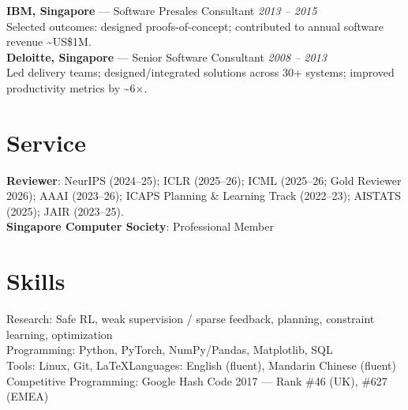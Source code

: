 \documentclass[10pt,a4paper]{article}
\newcommand{\role}[3]{\textbf{#1} --- #2 \hfill \textit{#3}\\}
\begin{document}
\role{IBM, Singapore}{Software Presales Consultant}{2013 -- 2015}
Selected outcomes: designed proofs-of-concept; contributed to annual software revenue \textasciitilde US\$1M.\\

\role{Deloitte, Singapore}{Senior Software Consultant}{2008 -- 2013}
Led delivery teams; designed/integrated solutions across 30+ systems; improved productivity metrics by \textasciitilde 6$\times$.\\

\section*{Service}
\textbf{Reviewer}: NeurIPS (2024--25); ICLR (2025--26); ICML (2025--26; Gold Reviewer 2026); AAAI (2023--26); ICAPS Planning \& Learning Track (2022--23); AISTATS (2025); JAIR (2023--25).\\
\textbf{Singapore Computer Society}: Professional Member

\section*{Skills}
Research: Safe RL, weak supervision / sparse feedback, planning, constraint learning, optimization\\
Programming: Python, PyTorch, NumPy/Pandas, Matplotlib, SQL\\
Tools: Linux, Git, \LaTeX  \hfill Languages: English (fluent), Mandarin Chinese (fluent)\\
Competitive Programming: Google Hash Code 2017 --- Rank \#46 (UK), \#627 (EMEA)
\end{document}
